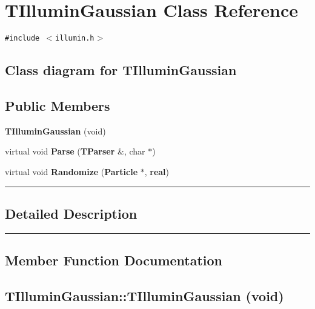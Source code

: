 \section{TIlluminGaussian  Class Reference}
\label{TIlluminGaussian}


{\tt \#include $<$illumin.h$>$}

\subsection*{Class diagram for TIlluminGaussian}
\begin{figure}[H]
\begin{center}
\leavevmode
\setlength{\epsfysize}{2cm}
\end{center}
\end{figure}
\subsection*{Public Members}
\begin{CompactItemize}
\item 
{\bf TIllumin\-Gaussian} (void)
\item 
virtual void {\bf Parse} ({\bf TParser} \&, char $\ast$)
\item 
virtual void {\bf Randomize} ({\bf Particle} $\ast$, {\bf real})
\end{CompactItemize}
\vspace{0.4cm}\hrule\vspace{0.2cm}
\subsection*{Detailed Description}
\vspace{0.4cm}\hrule\vspace{0.2cm}
\subsection*{Member Function Documentation}
\label{TIlluminGaussian_a0}
\subsection{\setlength{\rightskip}{0pt plus 5cm}TIllumin\-Gaussian::TIllumin\-Gaussian (void)}

